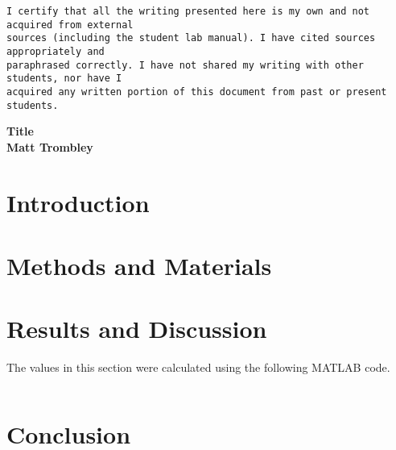 \documentclass [12pt,fleqn] {article}
\begin{document}
\begin{Verbatim}[baselinestretch=1.00] 
I certify that all the writing presented here is my own and not acquired from external 
sources (including the student lab manual). I have cited sources appropriately and 
paraphrased correctly. I have not shared my writing with other students, nor have I 
acquired any written portion of this document from past or present students.
\end{Verbatim}
\begin{center}
	\huge{\textbf{Title}} \\
	\large{\textbf{Matt Trombley}} \vspace{-5mm}
\end{center}
\section{Introduction} \vspace{-5mm}
\restoregeometry
\section{Methods and Materials}
\section{Results and Discussion} \vspace{-3mm}
\par The values in this section were calculated using the following MATLAB code. 
	\scriptsize\begin{Verbatim}[baselinestretch=1.00]
	\end{Verbatim}
\normalsize \vspace{-10mm}
\section{Conclusion} 
\newpage
\renewcommand{\refname}{\normalfont\selectfont\normalsize \textbf{References}} 
\begin{thebibliography}{3}
\end{thebibliography}
\end{document}
